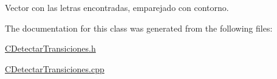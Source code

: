 Vector con las letras encontradas, emparejado con contorno. 



The documentation for this class was generated from the following files\+:\begin{DoxyCompactItemize}
\item 
\hyperlink{CDetectarTransiciones_8h}{C\+Detectar\+Transiciones.\+h}\item 
\hyperlink{CDetectarTransiciones_8cpp}{C\+Detectar\+Transiciones.\+cpp}\end{DoxyCompactItemize}
